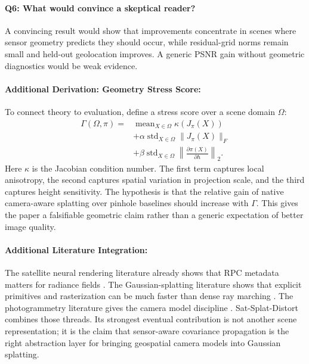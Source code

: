 \documentclass{article}
\begin{document}
\paragraph{Q6: What would convince a skeptical reader?}
A convincing result would show that improvements concentrate in scenes where sensor geometry predicts they should occur, while residual-grid norms remain small and held-out geolocation improves. A generic PSNR gain without geometric diagnostics would be weak evidence.

\paragraph{Additional Derivation: Geometry Stress Score:}

To connect theory to evaluation, define a stress score over a scene domain $\Omega$:
\begin{equation}
\begin{aligned}
\Gamma(\Omega,\pi)=&\operatorname{mean}_{X\in\Omega}\kappa(J_{\pi}(X))\\
&+\alpha\operatorname{std}_{X\in\Omega}\|J_{\pi}(X)\|_F\\
&+\beta\operatorname{std}_{X\in\Omega}\left\|\frac{\partial \pi(X)}{\partial h}\right\|_2 .
\end{aligned}
\end{equation}
Here $\kappa$ is the Jacobian condition number. The first term captures local anisotropy, the second captures spatial variation in projection scale, and the third captures height sensitivity. The hypothesis is that the relative gain of native camera-aware splatting over pinhole baselines should increase with $\Gamma$. This gives the paper a falsifiable geometric claim rather than a generic expectation of better image quality.

\paragraph{Additional Literature Integration:}

The satellite neural rendering literature already shows that RPC metadata matters for radiance fields \citep{mar2022satnerf,mar2023eonerf}. The Gaussian-splatting literature shows that explicit primitives and rasterization can be much faster than dense ray marching \citep{kerbl20233d}. The photogrammetry literature gives the camera model discipline \citep{tao2001rpc,grodecki2003block}. Sat-Splat-Distort combines those threads. Its strongest eventual contribution is not another scene representation; it is the claim that sensor-aware covariance propagation is the right abstraction layer for bringing geospatial camera models into Gaussian splatting.
\end{document}
